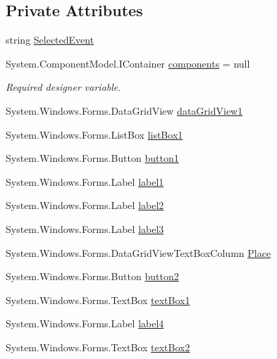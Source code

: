 \subsection*{Private Attributes}
\begin{DoxyCompactItemize}
\item 
string \hyperlink{classPCO_1_1__0_1_1ScoringForm_aaa61029f62d413187283b96fa272b661}{Selected\+Event}
\item 
System.\+Component\+Model.\+I\+Container \hyperlink{classPCO_1_1__0_1_1ScoringForm_a238c9307e7ffe22b4d8e14a46a662ad7}{components} = null
\begin{DoxyCompactList}\small\item\em Required designer variable. \end{DoxyCompactList}\item 
System.\+Windows.\+Forms.\+Data\+Grid\+View \hyperlink{classPCO_1_1__0_1_1ScoringForm_a291143cc88a016f10f58fa7d048f9bfd}{data\+Grid\+View1}
\item 
System.\+Windows.\+Forms.\+List\+Box \hyperlink{classPCO_1_1__0_1_1ScoringForm_a1d8e561957cc9b2b1e8b8ba020146fa8}{list\+Box1}
\item 
System.\+Windows.\+Forms.\+Button \hyperlink{classPCO_1_1__0_1_1ScoringForm_ae18f67ae6a9b3ec07df6906ed58e6c86}{button1}
\item 
System.\+Windows.\+Forms.\+Label \hyperlink{classPCO_1_1__0_1_1ScoringForm_ae5175573b853fa4a41c932659ad4f849}{label1}
\item 
System.\+Windows.\+Forms.\+Label \hyperlink{classPCO_1_1__0_1_1ScoringForm_af0dd988c86ad1061fdec991c860c50ee}{label2}
\item 
System.\+Windows.\+Forms.\+Label \hyperlink{classPCO_1_1__0_1_1ScoringForm_adff715a0754a45263fda7bbf04d3d081}{label3}
\item 
System.\+Windows.\+Forms.\+Data\+Grid\+View\+Text\+Box\+Column \hyperlink{classPCO_1_1__0_1_1ScoringForm_a032fbd87d18a6e0907a83c282e4f2560}{Place}
\item 
System.\+Windows.\+Forms.\+Button \hyperlink{classPCO_1_1__0_1_1ScoringForm_a9313a2d479643918e22a9c40ce624e8f}{button2}
\item 
System.\+Windows.\+Forms.\+Text\+Box \hyperlink{classPCO_1_1__0_1_1ScoringForm_adc8b58eb57aed1d19dd9d44e5cfc910b}{text\+Box1}
\item 
System.\+Windows.\+Forms.\+Label \hyperlink{classPCO_1_1__0_1_1ScoringForm_afd53cf291beebbd1e52c6500f8d761bb}{label4}
\item 
System.\+Windows.\+Forms.\+Text\+Box \hyperlink{classPCO_1_1__0_1_1ScoringForm_a9b7dea60c839e9e490136e415cbca689}{text\+Box2}

\end{DoxyCompactItemize}
